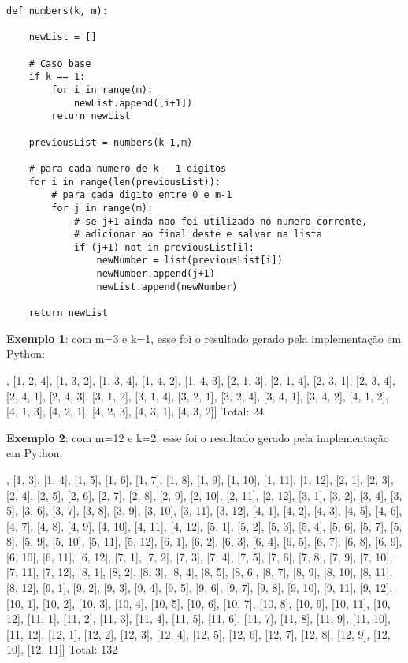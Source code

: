 {\color{red}
\begin{verbatim}
def numbers(k, m):

    newList = []

    # Caso base
    if k == 1:
        for i in range(m):
            newList.append([i+1])
        return newList

    previousList = numbers(k-1,m)

    # para cada numero de k - 1 digitos
    for i in range(len(previousList)):
        # para cada digito entre 0 e m-1
        for j in range(m):
            # se j+1 ainda nao foi utilizado no numero corrente,
            # adicionar ao final deste e salvar na lista
            if (j+1) not in previousList[i]:
                newNumber = list(previousList[i])
                newNumber.append(j+1)
                newList.append(newNumber)

    return newList
\end{verbatim}
}

\textbf{Exemplo 1}: com m=3 e k=1, esse foi o resultado gerado pela implementação em Python:

{\color{blue}
\begin{spverbatim}
[[1, 2, 3], [1, 2, 4], [1, 3, 2], [1, 3, 4], [1, 4, 2], [1, 4, 3], [2, 1, 3], [2, 1, 4], [2, 3, 1], [2, 3, 4], [2, 4, 1], [2, 4, 3], [3, 1, 2], [3, 1, 4], [3, 2, 1], [3, 2, 4], [3, 4, 1], [3, 4, 2], [4, 1, 2], [4, 1, 3], [4, 2, 1], [4, 2, 3], [4, 3, 1], [4, 3, 2]]
Total: 24

\end{spverbatim}
}

\textbf{Exemplo 2}: com m=12 e k=2, esse foi o resultado gerado pela implementação em Python:

{\color{blue}
\begin{spverbatim}
[[1, 2], [1, 3], [1, 4], [1, 5], [1, 6], [1, 7], [1, 8], [1, 9], [1, 10], [1, 11], [1, 12], [2, 1], [2, 3], [2, 4], [2, 5], [2, 6], [2, 7], [2, 8], [2, 9], [2, 10], [2, 11], [2, 12], [3, 1], [3, 2], [3, 4], [3, 5], [3, 6], [3, 7], [3, 8], [3, 9], [3, 10], [3, 11], [3, 12], [4, 1], [4, 2], [4, 3], [4, 5], [4, 6], [4, 7], [4, 8], [4, 9], [4, 10], [4, 11], [4, 12], [5, 1], [5, 2], [5, 3], [5, 4], [5, 6], [5, 7], [5, 8], [5, 9], [5, 10], [5, 11], [5, 12], [6, 1], [6, 2], [6, 3], [6, 4], [6, 5], [6, 7], [6, 8], [6, 9], [6, 10], [6, 11], [6, 12], [7, 1], [7, 2], [7, 3], [7, 4], [7, 5], [7, 6], [7, 8], [7, 9], [7, 10], [7, 11], [7, 12], [8, 1], [8, 2], [8, 3], [8, 4], [8, 5], [8, 6], [8, 7], [8, 9], [8, 10], [8, 11], [8, 12], [9, 1], [9, 2], [9, 3], [9, 4], [9, 5], [9, 6], [9, 7], [9, 8], [9, 10], [9, 11], [9, 12], [10, 1], [10, 2], [10, 3], [10, 4], [10, 5], [10, 6], [10, 7], [10, 8], [10, 9], [10, 11], [10, 12], [11, 1], [11, 2], [11, 3], [11, 4], [11, 5], [11, 6], [11, 7], [11, 8], [11, 9], [11, 10], [11, 12], [12, 1], [12, 2], [12, 3], [12, 4], [12, 5], [12, 6], [12, 7], [12, 8], [12, 9], [12, 10], [12, 11]]
Total: 132

\end{spverbatim}
}

